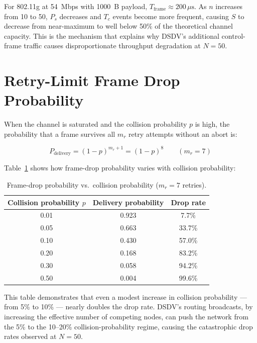 For 802.11g at 54~Mbps with 1000~B payload, $T_{\text{frame}} \approx 200\,\mu\text{s}$.
As $n$ increases from 10 to 50, $P_s$ decreases and $T_c$ events become more frequent,
causing $S$ to decrease from near-maximum to well below 50\% of the theoretical channel
capacity. This is the mechanism that explains why DSDV's additional control-frame
traffic causes disproportionate throughput degradation at $N = 50$.

\section{Retry-Limit Frame Drop Probability}

When the channel is saturated and the collision probability $p$ is high, the probability
that a frame survives all $m_r$ retry attempts without an abort is:

\begin{equation}
  P_{\text{delivery}} = (1 - p)^{m_r + 1} = (1-p)^8 \qquad (m_r = 7)
  \label{eq:drop_prob}
\end{equation}

Table~\ref{tab:drop_prob} shows how frame-drop probability varies with collision
probability:

\begin{table}[ht]
\centering
\caption{Frame-drop probability vs.\ collision probability ($m_r = 7$ retries).}
\label{tab:drop_prob}
\begin{tabular}{@{}ccc@{}}
\toprule
\textbf{Collision probability $p$} & \textbf{Delivery probability} & \textbf{Drop rate} \\
\midrule
0.01 & 0.923 & 7.7\% \\
0.05 & 0.663 & 33.7\% \\
0.10 & 0.430 & 57.0\% \\
0.20 & 0.168 & 83.2\% \\
0.30 & 0.058 & 94.2\% \\
0.50 & 0.004 & 99.6\% \\
\bottomrule
\end{tabular}
\end{table}

This table demonstrates that even a modest increase in collision probability --- from 5\%
to 10\% --- nearly doubles the drop rate. DSDV's routing broadcasts, by increasing the
effective number of competing nodes, can push the network from the 5\% to the 10--20\%
collision-probability regime, causing the catastrophic drop rates observed at $N = 50$.
